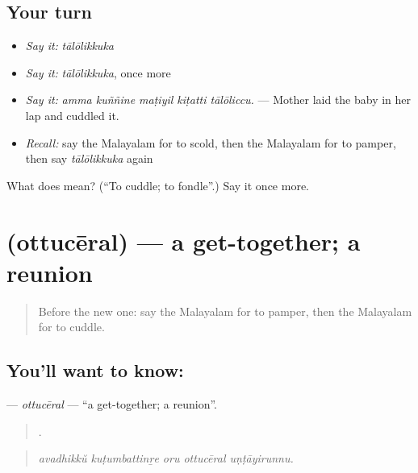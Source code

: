 \subsection*{Your turn}
\begin{itemize}
\raggedright
  \item \emph{Say it:} \emph{tālōlikkuka}
  \item \emph{Say it:} \emph{tālōlikkuka}, once more
  \item \emph{Say it:} \emph{amma kuññine maṭiyil kiṭatti tālōliccu.} — Mother laid the baby in her lap and cuddled it.
  \item \emph{Recall:} say the Malayalam for to scold, then the Malayalam for to pamper, then say \emph{tālōlikkuka} again
\end{itemize}

\begin{tcolorbox}[breakable,colback=teal!4,colframe=teal!35!black,title={Before you move on}]
What does  mean? (\textquotedblleft{}To cuddle; to fondle\textquotedblright{}.) Say it once more.
\end{tcolorbox}
\section[\texorpdfstring{\ml{ഒത്തുചേരൽ} (ottucēral)}{ഒത്തുചേരൽ (ottucēral)}]{ (ottucēral) — a get-together; a reunion}

\label{lesson:ML-C557-ottuceral}



\begin{quote}
Before the new one: say the Malayalam for to pamper, then the Malayalam for to cuddle.
\end{quote}

\subsection*{You'll want to know: }
\textbf{} — \emph{ottucēral} — \textquotedblleft{}a get-together; a reunion\textquotedblright{}.

\begin{quote}
    .
\end{quote}

\begin{quote}
\emph{avadhikkŭ kuṭumbattinṟe oru ottucēral uṇṭāyirunnu.}
\end{quote}


